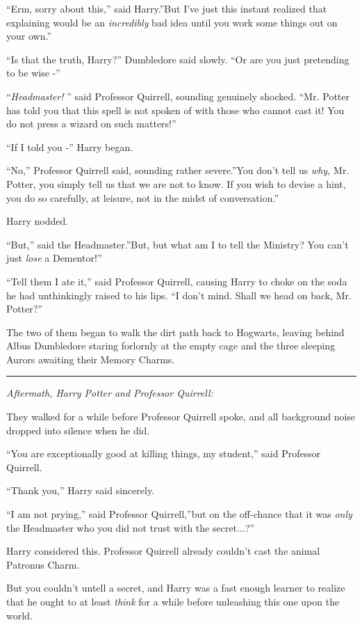 ``Erm, sorry about this,'' said Harry.''But I've just this instant
realized that explaining would be an \emph{incredibly} bad idea until
you work some things out on your own.''

``Is that the truth, Harry?'' Dumbledore said slowly. ``Or are you just
pretending to be wise -''

``\emph{Headmaster!} '' said Professor Quirrell, sounding genuinely
shocked. ``Mr. Potter has told you that this spell is not spoken of with
those who cannot cast it! You do not press a wizard on such matters!''

``If I told you -'' Harry began.

``No,'' Professor Quirrell said, sounding rather severe.''You don't tell
us \emph{why,} Mr. Potter, you simply tell us that we are not to know.
If you wish to devise a hint, you do so carefully, at leisure, not in
the midst of conversation.''

Harry nodded.

``But,'' said the Headmaster.''But, but what am I to tell the Ministry?
You can't just \emph{lose} a Dementor!''

``Tell them I ate it,'' said Professor Quirrell, causing Harry to choke
on the soda he had unthinkingly raised to his lips. ``I don't mind.
Shall we head on back, Mr. Potter?''

The two of them began to walk the dirt path back to Hogwarts, leaving
behind Albus Dumbledore staring forlornly at the empty cage and the
three sleeping Aurors awaiting their Memory Charms.

\begin{center}\rule{3in}{0.4pt}\end{center}

\emph{Aftermath, Harry Potter and Professor Quirrell:}

They walked for a while before Professor Quirrell spoke, and all
background noise dropped into silence when he did.

``You are exceptionally good at killing things, my student,'' said
Professor Quirrell.

``Thank you,'' Harry said sincerely.

``I am not prying,'' said Professor Quirrell,''but on the off-chance
that it was \emph{only} the Headmaster who you did not trust with the
secret...?''

Harry considered this. Professor Quirrell already couldn't cast the
animal Patronus Charm.

But you couldn't untell a secret, and Harry was a fast enough learner to
realize that he ought to at least \emph{think} for a while before
unleashing this one upon the world.

